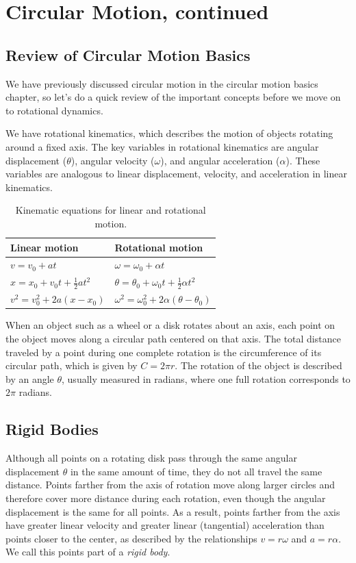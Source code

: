 \chapter{Circular Motion, continued}
\section{Review of Circular Motion Basics}
We have previously discussed circular motion in the circular motion basics chapter, so let's do a quick review of the important concepts before we move on to rotational dynamics.

We have rotational kinematics, which describes the motion of objects rotating around a fixed axis. The key variables in rotational kinematics are angular displacement ($\theta$), angular velocity ($\omega$), and angular acceleration ($\alpha$). These variables are analogous to linear displacement, velocity, and acceleration in linear kinematics.

\begin{table}[H]
\centering
\begin{tabular}{l l}
Linear motion & Rotational motion \\ \hline
$v = v_0 + a t$ & $\omega = \omega_0 + \alpha t$ \\[4pt]
$x = x_0 + v_0 t + \tfrac{1}{2} a t^2$ & $\theta = \theta_0 + \omega_0 t + \tfrac{1}{2} \alpha t^2$ \\[4pt]
$v^2 = v_0^2 + 2a(x - x_0)$ & $\omega^2 = \omega_0^2 + 2\alpha(\theta - \theta_0)$
\end{tabular}
\caption{Kinematic equations for linear and rotational motion.}
\label{tab:kinematics}
\end{table}

When an object such as a wheel or a disk rotates about an axis, each point on the object moves along a circular path centered on that axis. The total distance traveled by a point during one complete rotation is the circumference of its circular path, which is given by $ C = 2\pi r $. The rotation of the object is described by an angle $ \theta $, usually measured in radians, where one full rotation corresponds to $ 2\pi $ radians.

\section{Rigid Bodies}
Although all points on a rotating disk pass through the same angular displacement $ \theta $ in the same amount of time, they do not all travel the same distance. Points farther from the axis of rotation move along larger circles and therefore cover more distance during each rotation, even though the angular displacement is the same for all points. As a result, points farther from the axis have greater linear velocity and greater linear (tangential) acceleration than points closer to the center, as described by the relationships $ v = r\omega $ and $ a = r\alpha $. We call this points part of a \emph{rigid body}.

